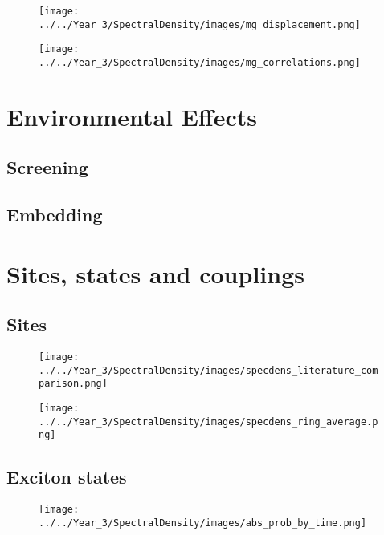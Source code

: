 \begin{figure}
    \texttt{[image: ../../Year\_3/SpectralDensity/images/mg\_displacement.png]}
\end{figure}

\begin{figure}
    \texttt{[image: ../../Year\_3/SpectralDensity/images/mg\_correlations.png]}
\end{figure} 

\section{Environmental Effects}
\subsection{Screening}
\label{subsec:screening}

\subsection{Embedding}
\label{subsec:embedding}


\section{Sites, states and couplings}
\label{sec:sites_states_couplings}

\subsection{Sites}
\label{subsec:sites}

\begin{figure}
    \texttt{[image: ../../Year\_3/SpectralDensity/images/specdens\_literature\_comparison.png]}
\end{figure}

\begin{figure}
    \texttt{[image: ../../Year\_3/SpectralDensity/images/specdens\_ring\_average.png]}
\end{figure}

\subsection{Exciton states}
\label{subsec:Absorption Probability}

\begin{figure}
    \texttt{[image: ../../Year\_3/SpectralDensity/images/abs\_prob\_by\_time.png]}
\end{figure}

